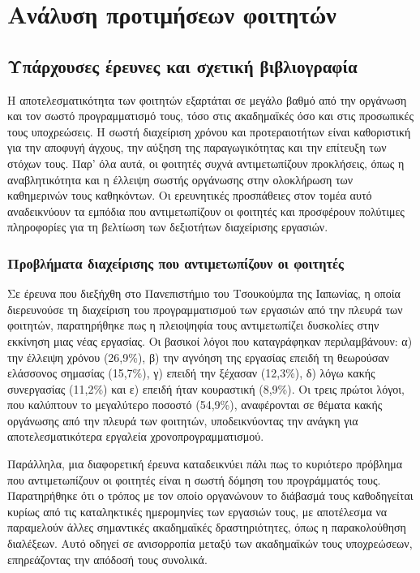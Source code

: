 \chapter{Ανάλυση προτιμήσεων φοιτητών}
    \section{Υπάρχουσες έρευνες και σχετική βιβλιογραφία}
        Η αποτελεσματικότητα των φοιτητών εξαρτάται σε μεγάλο βαθμό από την οργάνωση και τον σωστό προγραμματισμό τους, τόσο στις ακαδημαϊκές όσο και στις προσωπικές τους υποχρεώσεις. Η σωστή διαχείριση χρόνου και προτεραιοτήτων είναι καθοριστική για την αποφυγή άγχους, την αύξηση της παραγωγικότητας και την επίτευξη των στόχων τους. Παρ' όλα αυτά, οι φοιτητές συχνά αντιμετωπίζουν προκλήσεις, όπως η αναβλητικότητα και η έλλειψη σωστής οργάνωσης στην ολοκλήρωση των καθημερινών τους καθηκόντων. Οι ερευνητικές προσπάθειες στον τομέα αυτό αναδεικνύουν τα εμπόδια που αντιμετωπίζουν οι φοιτητές και προσφέρουν πολύτιμες πληροφορίες για τη βελτίωση των δεξιοτήτων διαχείρισης εργασιών.

        \subsection{Προβλήματα διαχείρισης που αντιμετωπίζουν οι φοιτητές} \label{sec:student_problems}
            Σε έρευνα \cite{Fukuzawa2015} που διεξήχθη στο Πανεπιστήμιο του Τσουκούμπα της Ιαπωνίας, η οποία διερευνούσε τη διαχείριση του προγραμματισμού των εργασιών από την πλευρά των φοιτητών, παρατηρήθηκε πως η πλειοψηφία τους αντιμετωπίζει δυσκολίες στην εκκίνηση μιας νέας εργασίας. Οι βασικοί λόγοι που καταγράφηκαν περιλαμβάνουν: α) την έλλειψη χρόνου (26,9\%), β) την αγνόηση της εργασίας επειδή τη θεωρούσαν ελάσσονος σημασίας (15,7\%), γ) επειδή την ξέχασαν (12,3\%), δ) λόγω κακής συνεργασίας (11,2\%) και ε) επειδή ήταν κουραστική (8,9\%). Οι τρεις πρώτοι λόγοι, που καλύπτουν το μεγαλύτερο ποσοστό (54,9\%), αναφέρονται σε θέματα κακής οργάνωσης από την πλευρά των φοιτητών, υποδεικνύοντας την ανάγκη για αποτελεσματικότερα εργαλεία χρονοπρογραμματισμού.

            Παράλληλα, μια διαφορετική έρευνα \cite{Trujillo2020} καταδεικνύει πάλι πως το κυριότερο πρόβλημα που αντιμετωπίζουν οι φοιτητές είναι η σωστή δόμηση του προγράμματός τους. Παρατηρήθηκε ότι ο τρόπος με τον οποίο οργανώνουν το διάβασμά τους καθοδηγείται κυρίως από τις καταληκτικές ημερομηνίες των εργασιών τους, με αποτέλεσμα να παραμελούν άλλες σημαντικές ακαδημαϊκές δραστηριότητες, όπως η παρακολούθηση διαλέξεων. Αυτό οδηγεί σε ανισορροπία μεταξύ των ακαδημαϊκών τους υποχρεώσεων, επηρεάζοντας την απόδοσή τους συνολικά.

